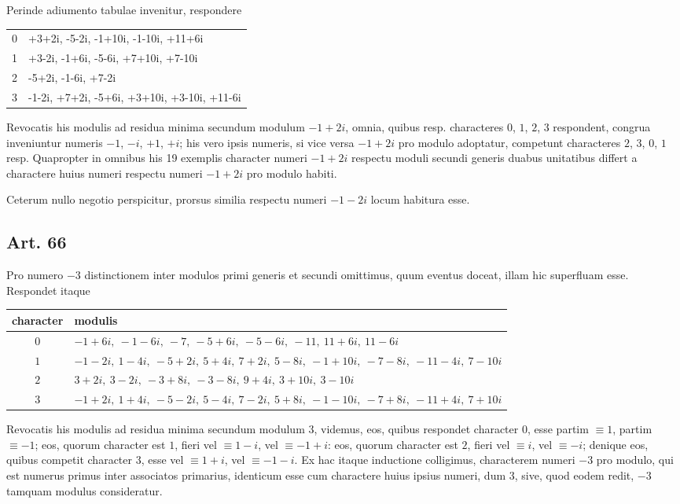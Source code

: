 \documentclass[12pt]{article}
\newcommand{\art}[1]{\subsection*{Art. #1}}
\begin{document}
Perinde adiumento tabulae invenitur, respondere

\begin{center}\small
\begin{tabular}{C L}
\toprule
{} & \\
 & +3+2i, -5-2i, -1+10i, -1-10i, +11+6i\\
1 & +3-2i, -1+6i, -5-6i, +7+10i, +7-10i\\
2 & -5+2i, -1-6i, +7-2i\\
3 & -1-2i, +7+2i, -5+6i, +3+10i, +3-10i, +11-6i\\
\bottomrule
\end{tabular}
\end{center}

Revocatis his modulis ad residua minima secundum modulum $-1+2i$, omnia, quibus resp. characteres $0$, $1$, $2$, $3$ respondent, congrua inveniuntur numeris $-1$, $-i$, $+1$, $+i$; his vero ipsis numeris, si vice versa $-1+2i$ pro modulo adoptatur, competunt characteres $2$, $3$, $0$, $1$ resp. Quapropter in omnibus his 19 exemplis character numeri $-1+2i$ respectu moduli secundi generis duabus unitatibus differt a charactere huius numeri respectu numeri $-1+2i$ pro modulo habiti.

Ceterum nullo negotio perspicitur, prorsus similia respectu numeri $-1-2i$ locum habitura esse.

\art{66}
Pro numero $-3$ distinctionem inter modulos primi generis et secundi omittimus, quum eventus doceat, illam hic superfluam esse. Respondet itaque
\begin{center}\small
\begin{tabular}{c p{5.4in}}
\toprule
character & modulis\\
\midrule
$0$ & $-1+6i,\ -1-6i,\ -7,\ -5+6i,\ -5-6i,\ -11,\ 11+6i,\ 11-6i$\\
$1$ & $-1-2i,\ 1-4i,\ -5+2i,\ 5+4i,\ 7+2i,\ 5-8i,\ -1+10i,\ -7-8i,\ -11-4i,\ 7-10i$\\
$2$ & $3+2i,\ 3-2i,\ -3+8i,\ -3-8i,\ 9+4i,\ 3+10i,\ 3-10i$\\
$3$ & $-1+2i,\ 1+4i,\ -5-2i,\ 5-4i,\ 7-2i,\ 5+8i,\ -1-10i,\ -7+8i,\ -11+4i,\ 7+10i$\\
\bottomrule
\end{tabular}
\end{center}

Revocatis his modulis ad residua minima secundum modulum $3$, videmus, eos, quibus respondet character $0$, esse partim $\equiv1$, partim $\equiv-1$; eos, quorum character est $1$, fieri vel $\equiv1-i$, vel $\equiv-1+i$: eos, quorum character est $2$, fieri vel $\equiv i$, vel $\equiv-i$; denique eos, quibus competit character $3$, esse vel $\equiv1+i$, vel $\equiv-1-i$. Ex hac itaque inductione colligimus, characterem numeri $-3$ pro modulo, qui est numerus primus inter associatos primarius, identicum esse cum charactere huius ipsius numeri, dum $3$, sive, quod eodem redit, $-3$ tamquam modulus consideratur.
\end{document}
